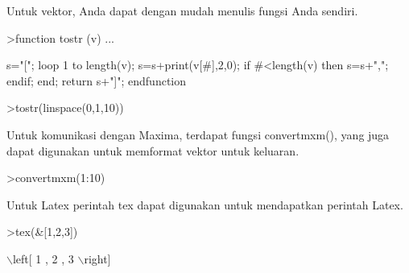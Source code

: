 \documentclass[a4paper,10pt]{article}
\begin{document}
\begin{eulernotebook}
\begin{eulercomment}
\begin{eulercomment}
\begin{eulercomment}
\begin{eulercomment}
\begin{eulercomment}
\begin{eulercomment}
\begin{eulercomment}
\begin{eulercomment}
\begin{eulercomment}
\begin{eulercomment}
\begin{eulercomment}
\begin{eulercomment}
\begin{eulercomment}
\begin{eulercomment}
\begin{eulercomment}
\begin{eulercomment}
\begin{eulercomment}
\begin{eulercomment}
\begin{eulercomment}
\begin{eulercomment}
\begin{eulercomment}
\begin{eulercomment}
\begin{eulercomment}
\begin{eulercomment}
\begin{eulercomment}
\begin{eulercomment}
\begin{eulercomment}
\begin{eulercomment}
\begin{eulercomment}
\begin{eulercomment}
\begin{eulercomment}
\begin{eulercomment}
\begin{eulercomment}
\begin{eulercomment}
\begin{eulercomment}
Untuk vektor, Anda dapat dengan mudah menulis fungsi Anda sendiri.
\end{eulercomment}
\begin{eulerprompt}
>function tostr (v) ...
\end{eulerprompt}
\begin{eulerudf}
  s="[";
  loop 1 to length(v);
     s=s+print(v[#],2,0);
     if #<length(v) then s=s+","; endif;
  end;
  return s+"]";
  endfunction
\end{eulerudf}
\begin{eulerprompt}
>tostr(linspace(0,1,10))
\end{eulerprompt}
\begin{euleroutput}
  [0.00,0.10,0.20,0.30,0.40,0.50,0.60,0.70,0.80,0.90,1.00]
\end{euleroutput}
\begin{eulercomment}
Untuk komunikasi dengan Maxima, terdapat fungsi convertmxm(), yang
juga dapat digunakan untuk memformat vektor untuk keluaran.
\end{eulercomment}
\begin{eulerprompt}
>convertmxm(1:10)
\end{eulerprompt}
\begin{euleroutput}
  [1,2,3,4,5,6,7,8,9,10]
\end{euleroutput}
\begin{eulercomment}
Untuk Latex perintah tex dapat digunakan untuk mendapatkan perintah
Latex.
\end{eulercomment}
\begin{eulerprompt}
>tex(&[1,2,3])
\end{eulerprompt}
\begin{euleroutput}
  \(\backslash\)left[ 1 , 2 , 3 \(\backslash\)right] 
\end{euleroutput}
\begin{eulercomment}

\end{eulercomment}
\end{eulercomment}
\end{eulercomment}
\end{eulercomment}
\end{eulercomment}
\end{eulercomment}
\end{eulercomment}
\end{eulercomment}
\end{eulercomment}
\end{eulercomment}
\end{eulercomment}
\end{eulercomment}
\end{eulercomment}
\end{eulercomment}
\end{eulercomment}
\end{eulercomment}
\end{eulercomment}
\end{eulercomment}
\end{eulercomment}
\end{eulercomment}
\end{eulercomment}
\end{eulercomment}
\end{eulercomment}
\end{eulercomment}
\end{eulercomment}
\end{eulercomment}
\end{eulercomment}
\end{eulercomment}
\end{eulercomment}
\end{eulercomment}
\end{eulercomment}
\end{eulercomment}
\end{eulercomment}
\end{eulercomment}
\end{eulercomment}
\end{eulernotebook}
\end{document}
